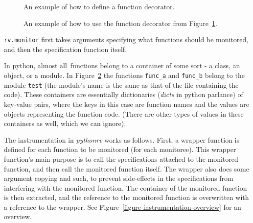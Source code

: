 \documentclass[a4paper,11pt]{kth-mag}
\begin{document}
\begin{figure}[h!]
	\begin{center}
	\begin{minipage}{0.7\textwidth}
	
	\end{minipage}
	\end{center}

	\caption{An example of how to define a function decorator.}
	\label{figure-function-decorator}
\end{figure}

\begin{figure}[h!]
	\begin{center}
	\begin{minipage}{0.7\textwidth}
	
	\end{minipage}
	\end{center}

	\caption{An example of how to use the function decorator from
	Figure~\ref{figure-function-decorator}.}
	\label{figure-function-decorator-usages}
\end{figure}

\texttt{rv.monitor} first takes arguments specifying what functions should be
monitored, and then the specification function itself.

In python, almost all\footnotemark\ functions belong to a container of some
sort - a class, an object, or a module. In
Figure~\ref{figure-function-decorator-usages} the functions \texttt{func\_a}
and \texttt{func\_b} belong to the module \texttt{test} (the module's name is
the same as that of the file containing the code). These containers are
essentially dictionaries (\textit{dicts} in python parlance) of key-value
pairs, where the keys in this case are function names and the values are
objects representing the function code. (There are other types of values in
these containers as well, which we can ignore).


The instrumentation in \textit{pythonrv} works as follows. First, a wrapper
function is defined for each function to be monitored (for each monitoree).
This wrapper function's main purpose is to call the specifications attached to
the monitored function, and then call the monitored function itself. The
wrapper also does some argument copying and such, to prevent side-effects in
the specifications from interfering with the monitored function. The container
of the monitored function is then extracted, and the reference to the monitored
function is overwritten with a reference to the wrapper. See
Figure~\ref{figure-instrumentation-overview} for an overview.
\end{document}
